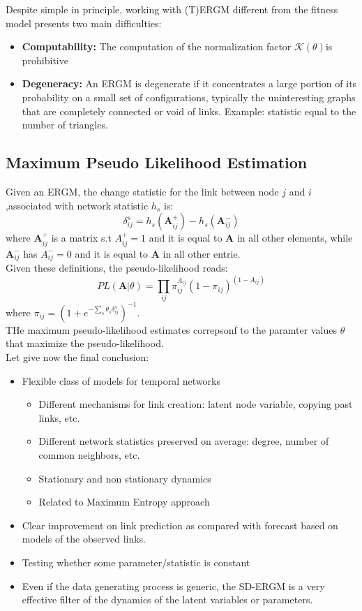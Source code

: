 Despite simple in principle, working with (T)ERGM different from the fitness model presents two main difficulties:
\begin{itemize}
	\item \textbf{Computability:} The computation of the normalization factor $\mathcal{K}(\theta) $is prohibitive
	\item \textbf{Degeneracy: }An ERGM is degenerate if it concentrates a large portion of its probability on a small set of configurations, typically the uninteresting graphs that are completely connected or void of links. Example: statistic equal to the number of triangles.
\end{itemize}
\subsection{Maximum Pseudo Likelihood Estimation}
Given an ERGM, the change statistic for the link between node $j$ and $i$,associated with network statistic $h_s$ is:
\[
\delta^s_{ij} = h_s(\mathbf{A}_{ij}^+)-h_s(\mathbf{A}_{ij}^-)
\]
where $\mathbf{A}_{ij}^+$ is a matrix s.t $A^+_{ij} =1$ and it is equal to $\mathbf{A}$ in all other elements, while $\mathbf{A}_{ij}^-$ has  $A^-_{ij} =0$ and it is equal to $\mathbf{A}$ in all other entrie.\\
Given these definitions, the pseudo-likelihood reads:
\[
PL(\mathbf{A}|\theta) = \prod_{ij} \pi_{ij}^{A_{ij}} (1- \pi_{ij})^{(1 - A_{ij})}
\]
where $\pi_{ij} = (1 + e^{-\sum_s \theta_s \delta^s_{ij}})^{-1}$.\\
THe maximum pseudo-likelihood estimates correpsonf to the paramter values $\theta$ that maximize the pseudo-likelihood.\\
Let give now the final conclusion:
\begin{itemize}
	\item Flexible class of models for temporal networks 
	\begin{itemize}
		\item Different mechanisms for link creation: latent node variable, copying past links, etc. 
		\item Different network statistics preserved on average: degree, number of common neighbors, etc. \item Stationary and non stationary dynamics 
		\item Related to Maximum Entropy approach
	\end{itemize}
	\item Clear improvement on link prediction as compared with forecast based on models of the observed links.
	\item Testing whether some parameter/statistic is constant 
	\item Even if the data generating process is generic, the SD-ERGM is a very effective filter of the dynamics of the latent variables or parameters.
\end{itemize}